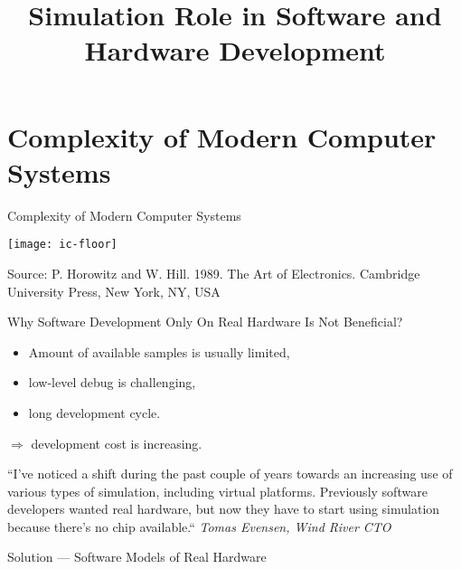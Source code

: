 

\title{Simulation Role in Software and Hardware Development}




\startslides

\section{Complexity of Modern Computer Systems}

\begin{frame}{Complexity of Modern Computer Systems}

\centering
\texttt{[image: ic-floor]}

\tiny{Source: P. Horowitz and W. Hill. 1989. The Art of Electronics. Cambridge
University Press, New York, NY, USA}

\end{frame}

\begin{frame}{Why Software Development Only On Real Hardware Is Not Beneficial?}

\begin{itemize}
\item Amount of available samples is usually limited,
\item low-level debug is challenging,
\item long development cycle.
\end{itemize}

$\Rightarrow$ development cost is increasing.

\bigskip

``\tiny{I've noticed a shift during the past couple of years towards an increasing
use of various types of simulation, including virtual platforms. Previously
software developers wanted real hardware, but now they have to start using
simulation because there's no chip available.``
\textit{Tomas Evensen, Wind River CTO}}

\end{frame}

\begin{frame}{Solution --- Software Models of Real Hardware}
\centering 
{}

\end{frame}

